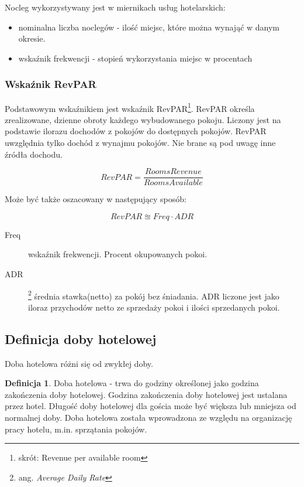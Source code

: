 \documentclass[a4paper,onecolumn,oneside,11pt,wide,floatssmall]{mwrep}
\theoremstyle{definition}
\newtheorem{defn}{Definicja}[section]
\theoremstyle{plain}%
\theoremstyle{remark}
\begin{document}
Nocleg wykorzystywany jest w miernikach usług hotelarskich:
\begin{itemize}
  \item nominalna liczba noclegów - ilość miejsc, które można wynająć w 
  danym okresie.
  \item wskaźnik frekwencji - stopień wykorzystania miejsc w procentach
\end{itemize}

\subsubsection{Wskaźnik RevPAR}
Podstawowym wskaźnikiem jest wskaźnik RevPAR\footnote{skrót: Revenue per 
available room}. RevPAR określa zrealizowane, 
dzienne obroty każdego wybudowanego pokoju. Liczony jest na podstawie
 ilorazu dochodów z pokojów do dostępnych pokojów. RevPAR uwzględnia tylko 
 dochód z wynajmu pokojów. Nie brane są pod uwagę inne źródła dochodu.

\begin{equation}
RevPAR = \frac{Rooms Revenue}{Rooms Available}
\end{equation}

Może być także oszacowany w następujący sposób:

\begin{equation}
RevPAR \approxeq Freq \cdot ADR
\end{equation}

\begin{description}
  \item[Freq] wskaźnik frekwencji. Procent okupowanych pokoi.
  \item[ADR]\footnote{ang. {\em Average Daily Rate} } średnia stawka(netto) 
  za pokój bez śniadania. ADR liczone jest jako iloraz przychodów netto ze 
  sprzedaży pokoi i ilości sprzedanych pokoi.

\end{description}

\subsection{Definicja doby hotelowej}
Doba hotelowa różni się od zwykłej doby.

\begin{defn}{Doba hotelowa} - trwa do godziny określonej jako godzina 
zakończenia doby 
hotelowej. Godzina zakończenia doby hotelowej jest ustalana przez hotel.
 Długość doby hotelowej dla gościa może być większa lub mniejsza 
od normalnej doby. Doba hotelowa została wprowadzona ze względu na 
organizację pracy hotelu, m.in. sprzątania pokojów.

\end{defn}
\end{document}
